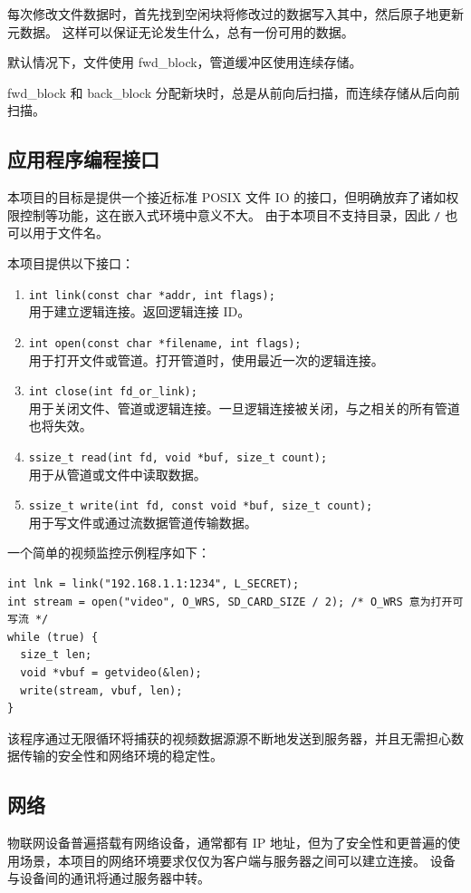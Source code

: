 \documentclass{ctexart}
\begin{document}
每次修改文件数据时，首先找到空闲块将修改过的数据写入其中，然后原子地更新元数据。
这样可以保证无论发生什么，总有一份可用的数据。

默认情况下，文件使用 fwd\_block，管道缓冲区使用连续存储。

fwd\_block 和 back\_block 分配新块时，总是从前向后扫描，而连续存储从后向前扫描。

\subsection{应用程序编程接口}
\label{design-api}
本项目的目标是提供一个接近标准 POSIX 文件 IO 的接口，但明确放弃了诸如权限控制等功能，这在嵌入式环境中意义不大。
由于本项目不支持目录，因此 \verb|/| 也可以用于文件名。

本项目提供以下接口：
\begin{enumerate}
	\item \verb|int link(const char *addr, int flags);|\\
	用于建立逻辑连接。返回逻辑连接 ID。
	\item \verb|int open(const char *filename, int flags);|\\
	用于打开文件或管道。打开管道时，使用最近一次的逻辑连接。
	\item \verb|int close(int fd_or_link);|\\
	用于关闭文件、管道或逻辑连接。一旦逻辑连接被关闭，与之相关的所有管道也将失效。
	\item \verb|ssize_t read(int fd, void *buf, size_t count);|\\
	用于从管道或文件中读取数据。
	\item \verb|ssize_t write(int fd, const void *buf, size_t count);|\\
	用于写文件或通过流数据管道传输数据。
\end{enumerate}

一个简单的视频监控示例程序如下：
\begin{verbatim}
int lnk = link("192.168.1.1:1234", L_SECRET);
int stream = open("video", O_WRS, SD_CARD_SIZE / 2); /* O_WRS 意为打开可写流 */
while (true) {
  size_t len;
  void *vbuf = getvideo(&len);
  write(stream, vbuf, len);
}
\end{verbatim}
该程序通过无限循环将捕获的视频数据源源不断地发送到服务器，并且无需担心数据传输的安全性和网络环境的稳定性。

\subsection{网络}
\label{design-network}
物联网设备普遍搭载有网络设备，通常都有 IP 地址，但为了安全性和更普遍的使用场景，本项目的网络环境要求仅仅为客户端与服务器之间可以建立连接。
设备与设备间的通讯将通过服务器中转。
\end{document}

